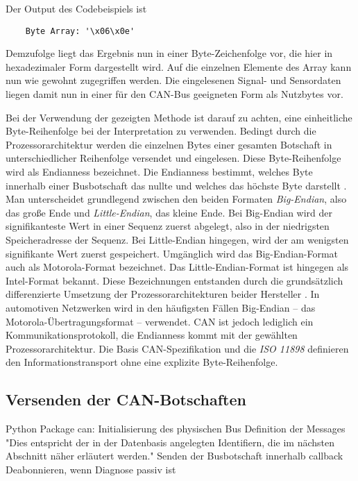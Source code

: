 Der Output des Codebeispiels ist
\begin{addmargin}[1cm]{0cm} 
	\begin{verbatim}
	Byte Array: '\x06\x0e'
	\end{verbatim}
\end{addmargin}

Demzufolge liegt das Ergebnis nun in einer Byte-Zeichenfolge vor, die hier in hexadezimaler Form dargestellt wird. Auf die einzelnen Elemente des Array kann nun wie gewohnt zugegriffen werden. Die eingelesenen Signal- und Sensordaten liegen damit nun in einer für den CAN-Bus geeigneten Form als Nutzbytes vor. 

Bei der Verwendung der gezeigten Methode ist darauf zu achten, eine einheitliche Byte-Reihenfolge bei der Interpretation zu verwenden. Bedingt durch die Prozessorarchitektur werden die einzelnen Bytes einer gesamten Botschaft in unterschiedlicher Reihenfolge versendet und eingelesen. Diese Byte-Reihenfolge wird als Endianness bezeichnet. Die Endianness bestimmt, welches Byte innerhalb einer Busbotschaft das nullte und welches das höchste Byte darstellt \cite{FordMotorCompany.2017}. Man unterscheidet grundlegend zwischen den beiden Formaten \emph{Big-Endian}, also das große Ende und \emph{Little-Endian}, das kleine Ende. Bei Big-Endian wird der signifikanteste Wert in einer Sequenz zuerst abgelegt, also in der niedrigsten Speicheradresse der Sequenz. Bei Little-Endian hingegen, wird der am wenigsten signifikante Wert zuerst gespeichert. Umgänglich wird das Big-Endian-Format auch als Motorola-Format bezeichnet. Das Little-Endian-Format ist hingegen als Intel-Format bekannt. Diese Bezeichnungen entstanden durch die grundsätzlich differenzierte Umsetzung der Prozessorarchitekturen beider Hersteller \cite{Rouse.2014}. In automotiven Netzwerken wird in den häufigsten Fällen Big-Endian – das Motorola-Übertragungsformat – verwendet. CAN ist jedoch lediglich ein Kommunikationsprotokoll, die Endianness kommt mit der gewählten Prozessorarchitektur. Die Basis CAN-Spezifikation und die \emph{ISO 11898} definieren den Informationstransport ohne eine explizite Byte-Reihenfolge.


\subsection{Versenden der CAN-Botschaften}
Python Package can:
Initialisierung des physischen Bus
Definition der Messages
"Dies entspricht der in der Datenbasis angelegten Identifiern, die im nächsten Abschnitt näher erläutert werden."
Senden der Busbotschaft innerhalb callback
Deabonnieren, wenn Diagnose passiv ist


